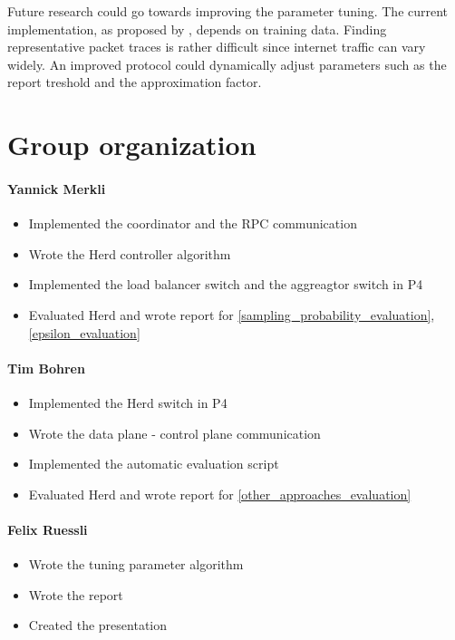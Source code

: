 \documentclass[11pt,oneside,a4paper]{article}
\begin{document}
Future research could go towards improving the parameter tuning. The current implementation, as proposed by \cite{anon2019herd}, depends on training data. Finding representative packet traces is rather difficult since internet traffic can vary widely. An improved protocol could dynamically adjust parameters such as the report treshold and the approximation factor.


\label{lastpage} %
\clearpage
{}



\clearpage
\appendix
{}

\section{Group organization}

\paragraph{Yannick Merkli}
\begin{itemize}
	\item Implemented the coordinator and the RPC communication
	\item Wrote the Herd controller algorithm
	\item Implemented the load balancer switch and the aggreagtor switch in P4
	\item Evaluated Herd and wrote report for \ref{sampling_probability_evaluation}, \ref{epsilon_evaluation}
\end{itemize}


\paragraph{Tim Bohren}
\begin{itemize}
	\item Implemented the Herd switch in P4
	\item Wrote the data plane - control plane communication
	\item Implemented the automatic evaluation script
	\item Evaluated Herd and wrote report for \ref{other_approaches_evaluation}
\end{itemize}

\paragraph{Felix Ruessli}
\begin{itemize}
	\item Wrote the tuning parameter algorithm
	\item Wrote the report
	\item Created the presentation
\end{itemize}
\end{document}
